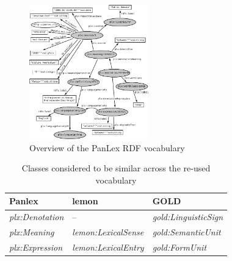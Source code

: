 \documentclass[sw]{iosart2c}
\begin{document}
\begin{figure}
\includegraphics[width=0.46\textwidth]{images/pdf/ontology.pdf}
\caption{Overview of the PanLex RDF vocabulary}
\label{fig:vocabulary}
\end{figure}

\begin{table}
  \centering\begin{scriptsize}
  \fontsize{6.5pt}{6.4pt}\selectfont
  \begin{tabular}{p{48px}p{62px}p{70px}}
    Panlex                  & lemon                       & GOLD \\
    \midrule
    \emph{plx:Denotation} & --                          & \emph{gold:LinguisticSign} \\
    \emph{plx:Meaning}    & \emph{lemon:LexicalSense} & \emph{gold:SemanticUnit} \\
    \emph{plx:Expression} & \emph{lemon:LexicalEntry} & \emph{gold:FormUnit} \\
  \end{tabular}
  \end{scriptsize}
  \caption{Classes considered to be similar across the re-used vocabulary}
  \label{tbl:sameclasses}
\end{table}
\end{document}
